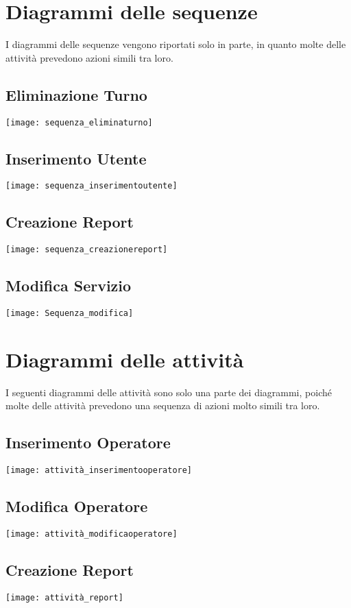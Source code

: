 \documentclass[green, fancy, 11pt]{elegantbook}
\begin{document}
\section{Diagrammi delle sequenze}
I diagrammi delle sequenze vengono riportati solo in parte, in quanto molte delle attività prevedono azioni simili tra loro.
\subsection{Eliminazione Turno}
\noindent \texttt{[image: sequenza\_eliminaturno]}
\newpage
\subsection{Inserimento Utente}
\noindent \texttt{[image: sequenza\_inserimentoutente]}
\subsection{Creazione Report}
\noindent \texttt{[image: sequenza\_creazionereport]}
\newpage
\subsection{Modifica Servizio}
\noindent \texttt{[image: Sequenza\_modifica]}
\newpage

\section{Diagrammi delle attività}
\noindent  I seguenti diagrammi delle attività sono solo una parte dei diagrammi, poiché molte delle attività prevedono una sequenza di azioni molto simili tra loro.
{\center
\subsection{Inserimento Operatore}
\noindent \texttt{[image: attività\_inserimentooperatore]}
\newpage
\subsection{Modifica Operatore}
\noindent \texttt{[image: attività\_modificaoperatore]}
\newpage
\subsection{Creazione Report}
\noindent \texttt{[image: attività\_report]}
\newpage
}
\end{document}
